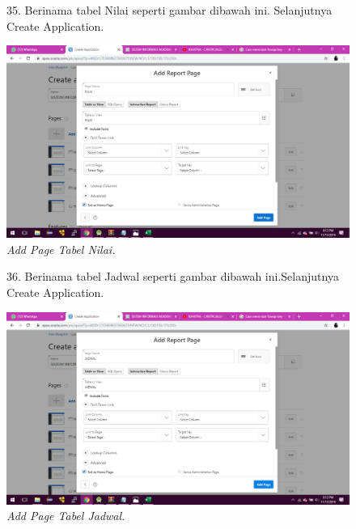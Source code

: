 \begin{enumerate}
\begin{figure}
\item[35.] Berinama tabel Nilai seperti gambar dibawah ini. Selanjutnya Create Application.	
	\begin{center}
    \includegraphics[scale=0.3]{figures/63.png}
    \caption{\textit{Add Page Tabel Nilai.}}
    \end{center}
    \label{gambar}
    \end{figure}

\begin{figure}
\item[36.] Berinama tabel Jadwal seperti gambar dibawah ini.Selanjutnya Create Application.    
    \begin{center}
    \includegraphics[scale=0.3]{figures/64.png}
    \caption{\textit{Add Page Tabel Jadwal.}}
    \end{center}
    \label{gambar}
    \end{figure}    


\end{enumerate}
